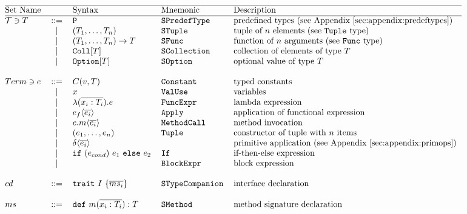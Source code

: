 \[\begin{tabular}{@{}l c l l l} 
\hline
Set Name				&  			& Syntax	& Mnemonic 		& Description \\
\hline
$\mathcal{T} \ni T$	& ::= 		& \lst{P} 	& \lst{SPredefType}	& predefined types (see Appendix~\ref{sec:appendix:predeftypes}) \\

			&	$\mid$	& $(T_1, \dots ,T_n) $	& \lst{STuple} & tuple of $n$ elements (see \lst{Tuple} type)\\

			&   $\mid$  & $(T_1,\dots,T_n) \to T $	& \lst{SFunc} & function of $n$ arguments (see \lst{Func} type) \\
			&   $\mid$  & $\text{\lst{Coll}}[T]$			& \lst{SCollection} & collection of elements of type $T$   \\
			&   $\mid$  & $\text{\lst{Option}}[T]$		& \lst{SOption} & optional value of type $T$  \\
			& 	     	&									& 				&		\\

$Term\ni e$	& ::= 		&   $C(v, T)$				& \lst{Constant} & typed constants  \\
			& 	$\mid$ 	& 	$x$ 					& \lst{ValUse} & variables  \\
			& 	$\mid$ 	& 	$\TyLam{x_i}{T_i}{e}$ 		& \lst{FuncExpr} & lambda expression \\
			& 	$\mid$ 	& 	$\Apply{e_f}{\Ov{e_i}}$ 	& \lst{Apply} & application of functional expression \\
			& 	$\mid$ 	& 	$\Apply{e.m}{\Ov{e_i}}$		& \lst{MethodCall} & method invocation  \\
			& 	$\mid$ 	&   $\Tup{e_1, \dots ,e_n}$ 	& \lst{Tuple} & constructor of tuple with $n$ items \\
			& 	$\mid$ 	& 	$\Apply{\delta}{\Ov{e_i}}$ 	& & primitive application (see Appendix~\ref{sec:appendix:primops}) \\
			& 	$\mid$ 	& 	\lst{if} $(e_{cond})$ $e_1$ \lst{else} $e_2$ & \lst{If} & if-then-else expression \\
			& 	$\mid$ 	&   $$  & \lst{BlockExpr} & block expression \\
			& 	     	&										& &				\\
$cd$   		& ::= 		& 	$\Trait{I}{\Ov{ms_i}}$				& \lst{STypeCompanion} & interface declaration    \\
			& 	     	&										& &				\\
$ms$	   	& ::= 	& $\MSig{m}{\overline{x_i : T_i}}{T}$ 	& \lst{SMethod} & method signature declaration   \\
\end{tabular}\] 

